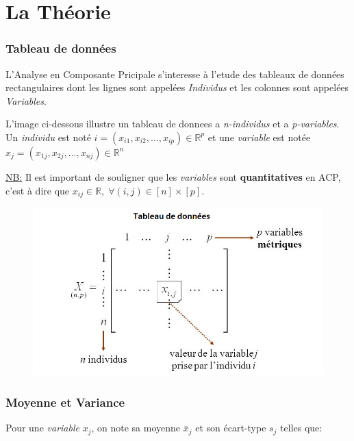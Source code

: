 \documentclass{article}
\begin{document}
\section{La Théorie}

\subsubsection{Tableau de données}

L'Analyse en Composante Pricipale s'interesse à l'etude des tableaux de données rectangulaires dont les lignes sont appelées \textit{Individus} et les colonnes sont appelées \textit{Variables}.
\newline

L'image ci-dessous illustre un tableau de donnees a \textit{n-individus} et a \textit{p-variables}. Un \textit{individu} est noté $i=(x_{i1},x_{i2}, ... ,x_{ip}) \in \mathbb{R}^p$ et une \textit{variable} est notée $x_j=(x_{1j},x_{2j}, ... ,x_{nj}) \in \mathbb{R}^n$
\newline

\underline{NB:} Il est important de souligner que les \textit{variables} sont \textbf{quantitatives} en ACP, c'est à dire que $x_{ij} \in \mathbb{R}, \; \forall (i,j) \in [n]\times[p].$

\begin{figure}[h!]
\includegraphics[width=\linewidth]{images/tableau.png}
\end{figure}

\subsubsection{Moyenne et Variance}

Pour une \textit{variable} ${x_j}$, on note sa moyenne $\bar{x}_j$ et son écart-type $s_j$ telles que:
\end{document}
